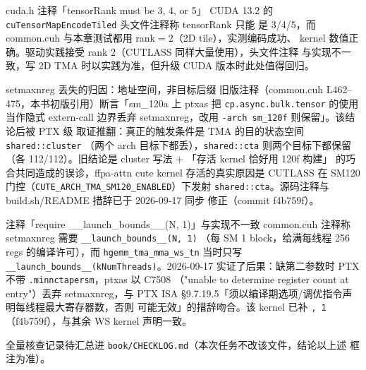 \begin{kaogu}[F2·文档 vs 实践]{cuda.h 注释「tensorRank must be 3, 4, or 5」}
  CUDA 13.2 的 \texttt{cu\allowbreak{}Tensor\allowbreak{}Map\allowbreak{}Encode\allowbreak{}Tiled} 头文件注释称 tensorRank 只能
  是 3/4/5，而 common.cuh 与本章测试都用 rank$=$2（2D tile），实测编码成功、
  kernel 数值正确。驱动实践接受 rank 2（CUTLASS 同样大量使用），头文件注释
  与实现不一致，写 2D TMA 时以实践为准，但升级 CUDA 版本时此处值得回归。
\end{kaogu}

\begin{kaogu}[F1·2026-09-17 修正]{setmaxnreg 丢失的归因：地址空间，非目标后缀}
  旧版注释（common.cuh L462--475，本书初版引用）断言「sm\_120a 上 ptxas 把
  \texttt{cp.\allowbreak{}async.\allowbreak{}bulk.\allowbreak{}tensor} 的使用当作隐式 extern-call 边界丢弃
  setmaxnreg，改用 \texttt{-arch sm\_120f} 则保留」。该结论后被 PTX 级
  取证推翻：真正的触发条件是 TMA 的目的状态空间 \texttt{shared::cluster}
  （两个 arch 目标下都丢），\texttt{shared::cta} 则两个目标下都保留
  （各 112/112）。旧结论是 cluster 写法 + 「存活 kernel 恰好用 120f 构建」
  的巧合共同造成的误诊，ffpa-attn cute kernel 存活的真实原因是 CUTLASS
  在 SM120 门控（\texttt{CUTE\_\allowbreak{}ARCH\_\allowbreak{}TMA\_\allowbreak{}SM120\_\allowbreak{}ENABLED}）下发射
  \texttt{shared::cta}。源码注释与 build.sh/README 措辞已于 2026-09-17 同步
  修正（commit f4b759f）。
\end{kaogu}

\begin{kaogu}[F2·已闭环]{注释「require \_\_launch\_bounds\_\_(N, 1)」与实现不一致}
  common.cuh 注释称 setmaxnreg 需要 \texttt{\_\allowbreak{}\_\allowbreak{}launch\_\allowbreak{}bounds\_\allowbreak{}\_\allowbreak{}(N,\allowbreak{} 1)}
  （每 SM 1 block，给满每线程 256 regs 的编译许可），而
  \texttt{hgemm\_\allowbreak{}tma\_\allowbreak{}mma\_\allowbreak{}ws\_\allowbreak{}tn} 当时只写
  \texttt{\_\allowbreak{}\_\allowbreak{}launch\_\allowbreak{}bounds\_\allowbreak{}\_\allowbreak{}\allowbreak{}(k\allowbreak{}Num\allowbreak{}Threads)}。2026-09-17
  实证了后果：缺第二参数时 PTX 不带 \texttt{.minnctapersm}，ptxas 以 C7508
  （"unable to determine register count at entry"）丢弃 setmaxnreg，与
  PTX ISA §9.7.19.5「须以编译期选项/调优指令声明每线程最大寄存器数，否则
  可能无效」的措辞吻合。该 kernel 已补 \texttt{, 1}（f4b759f），与其余 WS
  kernel 声明一致。
\end{kaogu}

全量核查记录待汇总进 \texttt{book/\allowbreak{}CHECKLOG.\allowbreak{}md}（本次任务不改该文件，结论以上述
框注为准）。

